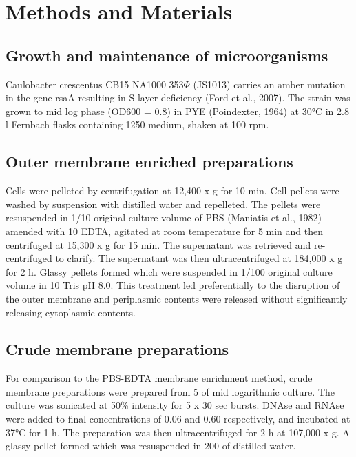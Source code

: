\section{Methods and Materials}
\label{sec:porin_methods}
\subsection{Growth and maintenance of microorganisms} 
\label{sub:porin_growth}
Caulobacter crescentus CB15 NA1000 353$\Phi$ (JS1013) carries an amber mutation in the gene rsaA resulting in S-layer deficiency (Ford et al., 2007). The strain was grown to mid log phase (\ac{OD600} = 0.8) in \ac{PYE} (Poindexter, 1964) at 30\si{\degreeCelsius} in 2.8 \si{\litre} Fernbach flasks containing 1250 \millilitre medium, shaken at 100 rpm.

\subsection{Outer membrane enriched preparations}
\label{sub:porin_omp_prep}
Cells were pelleted by centrifugation at 12,400 x g for 10 min. Cell pellets were washed by suspension with distilled water and repelleted. The pellets were resuspended in 1/10 original culture volume of \ac{PBS} (Maniatis et al., 1982) amended with 10 \millimolar \ac{EDTA}, agitated at room temperature for 5 min and then centrifuged at 15,300 x g for 15 min. The supernatant was retrieved and re-centrifuged to clarify. The supernatant was then ultracentrifuged at 184,000 x g for 2 h. Glassy pellets formed which were suspended in 1/100 original culture volume in 10 \millimolar Tris pH 8.0. This treatment led preferentially to the disruption of the outer membrane and periplasmic contents were released without significantly releasing cytoplasmic contents.

\subsection{Crude membrane preparations}
\label{sub:porin_crude_preps}
For comparison to the \ac{PBS}-\ac{EDTA} membrane enrichment method, crude membrane preparations were prepared from 5 \millilitre of mid logarithmic culture. The culture was sonicated at 50\% intensity for 5 x 30 sec bursts. DNAse and RNAse were added to final concentrations of 0.06 \mgperml and 0.60 \mgperml respectively, and incubated at 37\si{\degreeCelsius} for 1 h. The preparation was then ultracentrifuged for 2 h at 107,000 x g. A glassy pellet formed which was resuspended in 200 \microlitre of distilled water.


